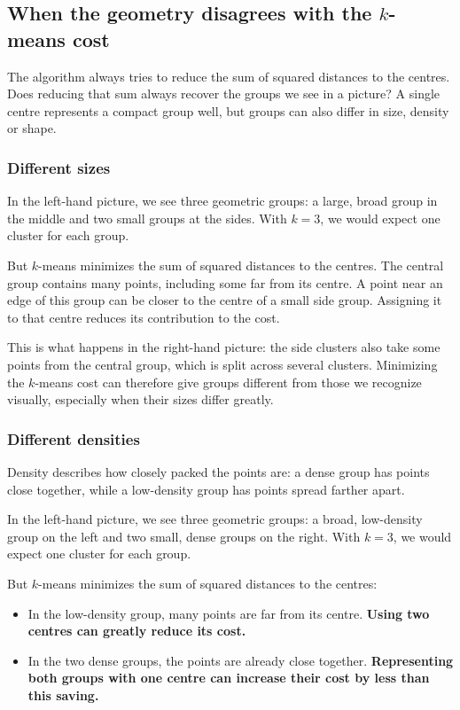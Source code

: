 \documentclass[a4paper,12pt,oneside]{report}
\begin{document}
\subsection{When the geometry disagrees with the $k$-means cost}
\label{sec:kmeans-geometric-limits}

The algorithm always tries to reduce the sum of squared distances
to the centres. Does reducing that sum always recover the groups
we see in a picture? A single centre represents a compact group
well, but groups can also differ in size, density or shape.

\subsubsection{Different sizes}

In the left-hand picture, we see three geometric groups: a large,
broad group in the middle and two small groups at the sides. With
$k=3$, we would expect one cluster for each group.

But $k$-means minimizes the sum of squared distances to the centres.
The central group contains many points, including some far from its
centre. A point near an edge of this group can be closer to the
centre of a small side group. Assigning it to that centre reduces
its contribution to the cost.

This is what happens in the right-hand picture: the side clusters
also take some points from the central group, which is split across
several clusters. Minimizing the $k$-means cost can therefore give
groups different from those we recognize visually, especially when
their sizes differ greatly.
\begin{center}

\end{center}

\subsubsection{Different densities}

Density describes how closely packed the points are: a dense group
has points close together, while a low-density group has points
spread farther apart.

In the left-hand picture, we see three geometric groups: a broad,
low-density group on the left and two small, dense groups on the
right. With $k=3$, we would expect one cluster for each group.

But $k$-means minimizes the sum of squared distances to the centres:
\begin{itemize}
  \item In the low-density group, many points are far from its
    centre. \textbf{Using two centres can greatly reduce its cost.}
  \item In the two dense groups, the points are already close
    together. \textbf{Representing both groups with one centre can
    increase their cost by less than this saving.}
\end{itemize}
\end{document}
